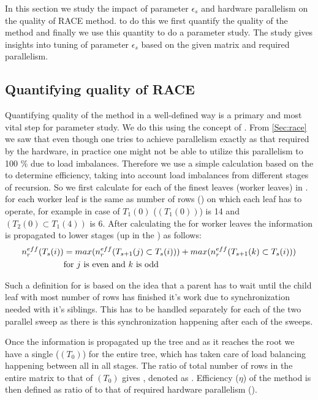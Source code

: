 
In this section we study the impact of parameter $\epsilon_s$ and hardware parallelism on the quality of  RACE method. \Inorder to do this we first quantify the quality of the method and finally we  use this quantity to do a parameter study. The study gives insights into tuning of parameter $\epsilon_s$ based on the given matrix and required parallelism.


\subsection{Quantifying quality of RACE}
Quantifying quality of the method in a well-defined way is a primary and most vital step for parameter study. We do this using the concept of \effPar. From \cref{Sec:race} we saw that even though one tries to achieve parallelism exactly as that required by the hardware, in practice one might not be able to utilize this parallelism to 100 \% due to load imbalances. Therefore we use a simple calculation based on the \levelTree to determine efficiency, taking into account load imbalances from different stages of recursion. So we first calculate \effRow for each of the finest leaves (worker leaves) in \levelTree. \EffRow for each worker leaf is the same as number of rows (\nrows) on which each leaf has to operate, for example in case of $T_1(0)$ \effRow (\nrowsEff$(T_1(0))$) is 14 and \nrowsEff$(T_2(0) \subset T_1(4))$ is 6. After calculating the \effRow for worker leaves the information is propagated to lower stages (up in the \levelTree) as follows: 
\begin{align*}
n_{r}^{eff}(T_s(i)) &= max(n_{r}^{eff}(T_{s+1}(j) \subset T_s(i))) + max(n_{r}^{eff}(T_{s+1}(k) \subset T_s(i)))\\
 & \text{for } j \text{ is even and } k \text{ is odd}
\end{align*}

Such a definition for \effRow is based on the idea that a parent has to wait until the child leaf with most number of rows has finished it's work due to synchronization needed with it's siblings. This has to be handled separately for each of the two parallel sweep as there is this synchronization happening after each of the sweeps. 

Once the information is propagated up the tree and as it reaches the root we have a single \effRow (\nrowsEff$(T_0)$) for the entire tree, which has taken care of load balancing happening between all \levelGroups in all stages. The ratio of total number of rows in the entire matrix to that of \nrowsEff$(T_0)$ gives \effPar, denoted as \threadEff. Efficiency ($\eta$) of the method is then defined as ratio of  \threadEff to that of required hardware parallelism (\nthreads). 

